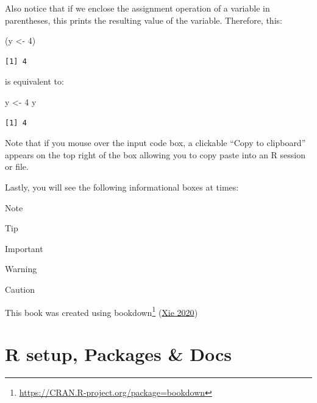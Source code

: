 \documentclass[
]{book}
\newenvironment{Shaded}{\begin{snugshade}}{\end{snugshade}}
\newcommand{\DecValTok}[1]{\textcolor[rgb]{0.00,0.00,0.81}{#1}}
\newcommand{\NormalTok}[1]{#1}
\newcommand{\OtherTok}[1]{\textcolor[rgb]{0.56,0.35,0.01}{#1}}
\DeclareRobustCommand{\href}[2]{#2\footnote{\url{#1}}}
\begin{document}
Also notice that if we enclose the assignment operation of a variable in parentheses, this prints the resulting value of the variable. Therefore, this:

\begin{Shaded}
\begin{Highlighting}[]
\NormalTok{(y }\OtherTok{\textless{}{-}} \DecValTok{4}\NormalTok{)}
\end{Highlighting}
\end{Shaded}

\begin{verbatim}
[1] 4
\end{verbatim}

is equivalent to:

\begin{Shaded}
\begin{Highlighting}[]
\NormalTok{y }\OtherTok{\textless{}{-}} \DecValTok{4}
\NormalTok{y}
\end{Highlighting}
\end{Shaded}

\begin{verbatim}
[1] 4
\end{verbatim}

Note that if you mouse over the input code box, a clickable ``Copy to clipboard'' appears on the top right of the box allowing you to copy paste into an R session or file.

Lastly, you will see the following informational boxes at times:

\begin{rmdnote}
Note
\end{rmdnote}

\begin{rmdtip}
Tip
\end{rmdtip}

\begin{rmdimportant}
Important
\end{rmdimportant}

\begin{rmdwarning}
Warning
\end{rmdwarning}

\begin{rmdcaution}
Caution
\end{rmdcaution}

This book was created using \href{https://CRAN.R-project.org/package=bookdown}{bookdown} (\protect\hyperlink{ref-R-bookdown}{Xie 2020})

\hypertarget{Rsetup}{%
\chapter{R setup, Packages \& Docs}\label{Rsetup}}
\end{document}
